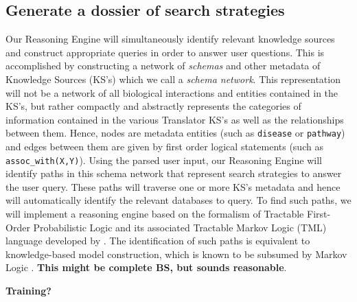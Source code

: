 \documentclass[11pt,notitlepage]{article}
\begin{document}
\subsection{Generate a dossier of search strategies}
\label{section:strategies}
Our Reasoning Engine will simultaneously identify relevant knowledge sources and construct appropriate queries in order to answer user questions. This is accomplished by constructing a network of \textit{schemas} and other metadata of Knowledge Sources (KS's) which we call a \textit{schema network}. This representation will not be a network of all biological interactions and entities contained in the KS's, but rather compactly and abstractly represents the categories of information contained in the various Translator KS's as well as the relationships between them. Hence, nodes are metadata entities (such as \verb|disease| or \verb|pathway|) and edges between them are given by first order logical statements (such as \verb|assoc_with(X,Y)|). Using the parsed user input, our Reasoning Engine will identify paths in this schema network that represent search strategies to answer the user query. These paths will traverse one or more KS's metadata and hence will automatically identify the relevant databases to query. To find such paths, we will implement a reasoning engine based on the formalism of Tractable First-Order Probabilistic Logic and its associated Tractable Markov Logic (TML) language developed by \citet{Domingos:2012wi}. The identification of such paths is equivalent to knowledge-based model construction, which is known to be subsumed by Markov Logic \cite{domingos20071}. \textbf{This might be complete BS, but sounds reasonable}.

\textbf{Training?}

\end{document}
